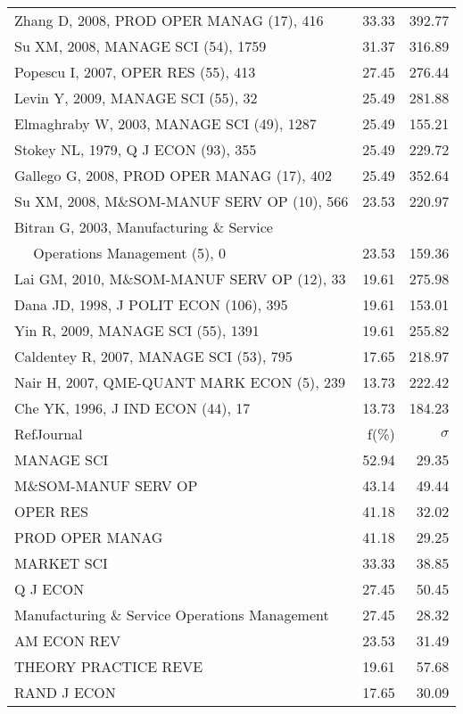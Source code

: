 \documentclass[a4paper,11pt]{report}
\begin{document}
\begin{landscape}
\begin{table}[!ht]
{\begin{tabular}{|l r r|}
Zhang D, 2008, PROD OPER MANAG (17), 416 & 33.33 & 392.77\\
Su XM, 2008, MANAGE SCI (54), 1759 & 31.37 & 316.89\\
Popescu I, 2007, OPER RES (55), 413 & 27.45 & 276.44\\
Levin Y, 2009, MANAGE SCI (55), 32 & 25.49 & 281.88\\
Elmaghraby W, 2003, MANAGE SCI (49), 1287 & 25.49 & 155.21\\
Stokey NL, 1979, Q J ECON (93), 355 & 25.49 & 229.72\\
Gallego G, 2008, PROD OPER MANAG (17), 402 & 25.49 & 352.64\\
Su XM, 2008, M\&SOM-MANUF SERV OP (10), 566 & 23.53 & 220.97\\
Bitran G, 2003, Manufacturing \& Service &  & \\
$\quad$ Operations Management (5), 0 & 23.53 & 159.36\\
Lai GM, 2010, M\&SOM-MANUF SERV OP (12), 33 & 19.61 & 275.98\\
Dana JD, 1998, J POLIT ECON (106), 395 & 19.61 & 153.01\\
Yin R, 2009, MANAGE SCI (55), 1391 & 19.61 & 255.82\\
Caldentey R, 2007, MANAGE SCI (53), 795 & 17.65 & 218.97\\
Nair H, 2007, QME-QUANT MARK ECON (5), 239 & 13.73 & 222.42\\
Che YK, 1996, J IND ECON (44), 17 & 13.73 & 184.23\\
\hline
\hline
RefJournal & f(\%) & $\sigma$\\
\hline
MANAGE SCI & 52.94 & 29.35\\
M\&SOM-MANUF SERV OP & 43.14 & 49.44\\
OPER RES & 41.18 & 32.02\\
PROD OPER MANAG & 41.18 & 29.25\\
MARKET SCI & 33.33 & 38.85\\
Q J ECON & 27.45 & 50.45\\
Manufacturing \& Service Operations Management & 27.45 & 28.32\\
AM ECON REV & 23.53 & 31.49\\
THEORY PRACTICE REVE & 19.61 & 57.68\\
RAND J ECON & 17.65 & 30.09\\
\hline
\end{tabular}
}
\end{table}

\end{landscape}
\end{document}
